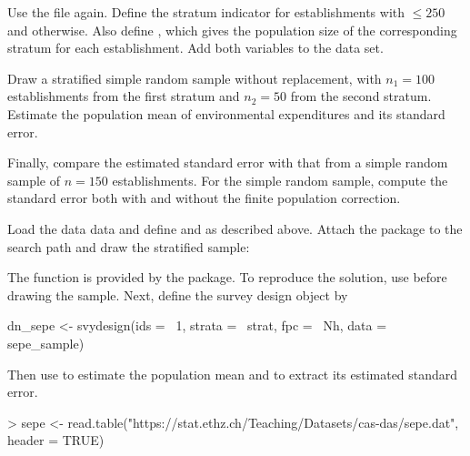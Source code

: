 




\begin{Problem}
    Use the file  again. Define the stratum indicator  for establishments with  $\leq 250$ and 
    otherwise. Also define , which gives the population size of the
    corresponding stratum for each establishment. Add both variables to the
    data set.

    Draw a stratified simple random sample without replacement, with
    $n_1 = 100$ establishments from the first stratum and $n_2 = 50$ from the
    second stratum. Estimate the population mean of environmental expenditures
    and its standard error.

    Finally, compare the estimated standard error with that from a simple
    random sample of $n = 150$ establishments. For the simple random sample,
    compute the standard error both with and without the finite population
    correction.

    \begin{Rhint}
        Load the data  data and define  and
         as described above. Attach the  package to the
        search path and draw the stratified sample:



        The function  is provided by the 
        package. To reproduce the solution, use  before
        drawing the sample. Next, define the survey design object by

\begin{Scode}
dn_sepe <- svydesign(ids = ~1, strata = ~strat, fpc = ~Nh,
                     data = sepe_sample)
\end{Scode}

        Then use  to estimate the population mean and
         to extract its estimated standard error.
    \end{Rhint}

\begin{Solution}

\begin{Schunk}
\begin{Sinput}
> sepe <- read.table("https://stat.ethz.ch/Teaching/Datasets/cas-das/sepe.dat",
                     header = TRUE)
\end{Sinput}
\end{Schunk}


\end{Solution}
\end{Problem}
